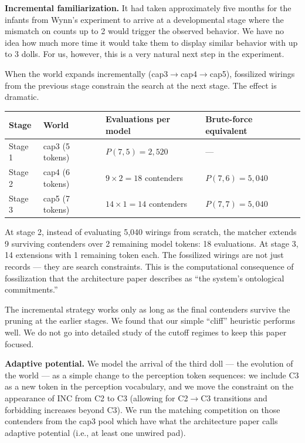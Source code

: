 \documentclass[12pt, a4paper]{article}
\begin{document}
\textbf{Incremental familiarization.} It had taken approximately five months
for the infants from Wynn's experiment to arrive at a developmental stage where
the mismatch on counts up to 2 would trigger the observed behavior. We have no
idea how much more time it would take them to display similar behavior with up
to 3 dolls. For us, however, this is a very natural next step in the
experiment.

When the world expands incrementally (cap3$\to$cap4$\to$cap5), fossilized
wirings from the previous stage constrain the search at the next stage. The
effect is dramatic.

\begin{center}
\begin{tabular}{llll}
\toprule
Stage & World & Evaluations per model & Brute-force equivalent \\
\midrule
Stage 1 & cap3 (5 tokens) & $P(7,5) = 2{,}520$ & --- \\
Stage 2 & cap4 (6 tokens) & $9 \times 2 = 18$ contenders & $P(7,6) = 5{,}040$ \\
Stage 3 & cap5 (7 tokens) & $14 \times 1 = 14$ contenders & $P(7,7) = 5{,}040$ \\
\bottomrule
\end{tabular}
\end{center}

At stage 2, instead of evaluating 5,040 wirings from scratch, the matcher
extends 9 surviving contenders over 2 remaining model tokens: 18 evaluations.
At stage 3, 14 extensions with 1 remaining token each. The fossilized wirings
are not just records --- they are search constraints. This is the computational
consequence of fossilization that the architecture paper describes as ``the
system's ontological commitments.''

The incremental strategy works only as long as the final contenders survive the
pruning at the earlier stages. We found that our simple ``cliff'' heuristic
performs well. We do not go into detailed study of the cutoff regimes to keep
this paper focused.

\textbf{Adaptive potential.} We model the arrival of the third doll --- the
evolution of the world --- as a simple change to the perception token
sequences: we include C3 as a new token in the perception vocabulary, and we
move the constraint on the appearance of INC from C2 to C3 (allowing for
C2$\to$C3 transitions and forbidding increases beyond C3). We run the matching
competition on those contenders from the cap3 pool which have what the
architecture paper calls adaptive potential (i.e., at least one unwired pad).
\end{document}

